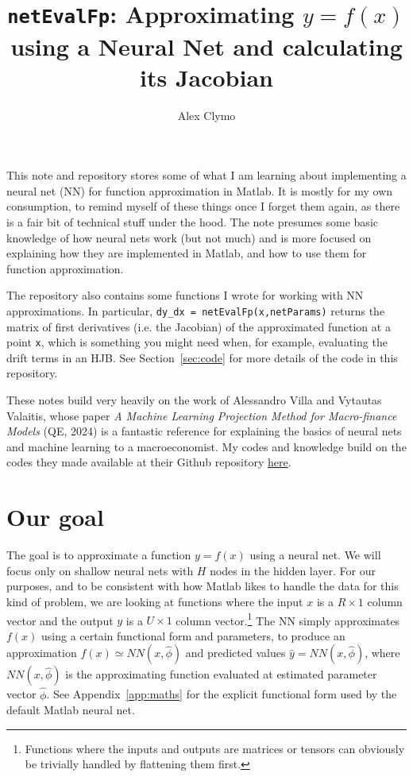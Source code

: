 \documentclass[a4paper,12pt]{article}
\newcommand{\sr}[1]{Section~\ref{sec:#1}}
\newcommand{\ar}[1]{Appendix~\ref{app:#1}}
\newcommand{\code}[1]{\texttt{#1}}
\begin{document}
\title{\code{netEvalFp}: Approximating $y=f(x)$ using a Neural Net and calculating its Jacobian}

\author{Alex Clymo}

\date{}

\maketitle

This note and repository stores some of what I am learning about implementing a neural net (NN) for function approximation in Matlab. It is mostly for my own consumption, to remind myself of these things once I forget them again, as there is a fair bit of technical stuff under the hood. The note presumes some basic knowledge of how neural nets work (but not much) and is more focused on explaining how they are implemented in Matlab, and how to use them for function approximation. 

The repository also contains some functions I wrote for working with NN approximations. In particular, \code{dy\_dx = netEvalFp(x,netParams)} returns the matrix of first derivatives (i.e. the Jacobian) of the approximated function at a point \code{x}, which is something you might need when, for example, evaluating the drift terms in an HJB. See \sr{code} for more details of the code in this repository. 


These notes build very heavily on the work of Alessandro Villa and Vytautas Valaitis, whose paper \emph{A Machine Learning Projection Method for Macro-finance Models} (QE, 2024) is a fantastic reference for explaining the basics of neural nets and machine learning to a macroeconomist. My codes and knowledge build on the codes they made available at their Github repository \href{https://github.com/forket86/ANNEA/}{here}. 


\section{Our goal}

The goal is to approximate a function $y=f(x)$ using a neural net. We will focus only on shallow neural nets with $H$ nodes in the hidden layer. For our purposes, and to be consistent with how Matlab likes to handle the data for this kind of problem, we are looking at functions where the input $x$ is a $R \times 1$ column vector and the output $y$ is a $U \times 1$ column vector.\footnote{Functions where the inputs and outputs are matrices or tensors can obviously be trivially handled by flattening them first.} The NN simply approximates $f(x)$ using a certain functional form and parameters, to produce an approximation $f(x) \simeq NN(x,\hat \phi)$ and predicted values $\hat y = NN(x,\hat \phi)$, where $NN(x,\hat \phi)$ is the approximating function evaluated at estimated parameter vector $\hat \phi$. See \ar{maths} for the explicit functional form used by the default Matlab neural net. 
\end{document}
